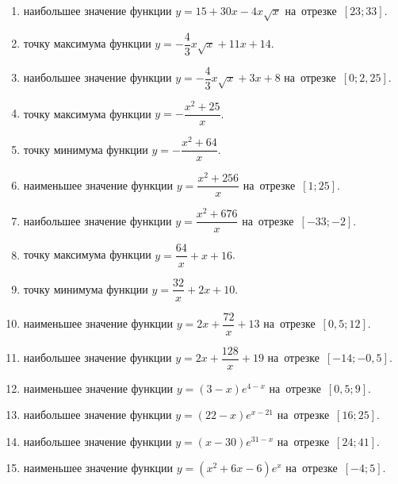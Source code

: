 \documentclass[a4paper,10pt]{article}
\begin{document}
\begin{enumerate}
\item {} наибольшее значение функции $y=15+30x -4x\sqrt{x}$ на~отрезке~$\left[23;33\right]$.

\item {} точку максимума функции $y=-\dfrac{4}{3}x\sqrt{x} +11x+14$.

\item {} наибольшее значение функции $y=-\dfrac{4}{3}x\sqrt{x} +3x+8$ на~отрезке~$\left[0;2,25\right]$.

\item {} точку максимума функции $y=-\dfrac{x^2 +25}{x}$.

\item {} точку минимума функции $y=-\dfrac{x^2 +64}{x}$.

\item {} наименьшее значение функции $y=\dfrac{x^2 +256}{x}$ на~отрезке~$\left[1;25\right]$.

\item {} наибольшее значение функции $y=\dfrac{x^2 +676}{x}$ на~отрезке~$\left[-33;-2\right]$.

\item {} точку максимума функции $y=\dfrac{64}{x} +x+16$.

\item {} точку минимума функции $y=\dfrac{32}{x} +2x+10$.

\item {} наименьшее значение функции $y=2x+\dfrac{72}{x} +13$ на~отрезке~$\left[0,5;12\right]$.

\item {} наибольшее значение функции $y=2x+\dfrac{128}{x} +19$ на~отрезке~$\left[-14;-0,5\right]$.

\item {} наименьшее значение функции $y=\left(3-x\right)e^{4-x}$ на~отрезке~$\left[0,5;9\right]$.

\item {} наибольшее значение функции $y=\left(22-x\right)e^{x-21}$ на~отрезке~$\left[16;25\right]$.

\item {} наибольшее значение функции $y=\left(x-30\right)e^{31-x}$ на~отрезке~$\left[24;41\right]$.

\item {} наименьшее значение функции $y=\left(x^2 +6x -6\right)e^{x }$ на~отрезке~$\left[-4;5\right]$.


\end{enumerate}
\end{document}
